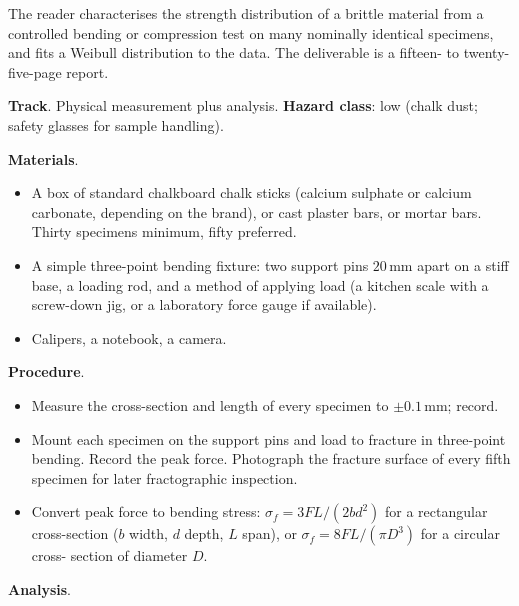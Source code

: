 \begin{project}
The reader characterises the strength distribution of a brittle
material from a controlled bending or compression test on many
nominally identical specimens, and fits a Weibull distribution to the
data. The deliverable is a fifteen- to twenty-five-page report.

\textbf{Track}. Physical measurement plus analysis.
\textbf{Hazard class}: low (chalk dust; safety glasses for sample
handling).

\textbf{Materials}.

\begin{itemize}[leftmargin=*]
\item A box of standard chalkboard chalk sticks (calcium sulphate or
  calcium carbonate, depending on the brand), or cast plaster bars,
  or mortar bars. Thirty specimens minimum, fifty preferred.
\item A simple three-point bending fixture: two support pins
  $20\,\text{mm}$ apart on a stiff base, a loading rod, and a method
  of applying load (a kitchen scale with a screw-down jig, or a
  laboratory force gauge if available).
\item Calipers, a notebook, a camera.
\end{itemize}

\textbf{Procedure}.

\begin{itemize}[leftmargin=*]
\item Measure the cross-section and length of every specimen to
  $\pm 0.1\,\text{mm}$; record.
\item Mount each specimen on the support pins and load to fracture in
  three-point bending. Record the peak force. Photograph the fracture
  surface of every fifth specimen for later fractographic inspection.
\item Convert peak force to bending stress: $\sigma_f = 3 F L / (2 b
  d^2)$ for a rectangular cross-section ($b$ width, $d$ depth, $L$
  span), or $\sigma_f = 8 F L / (\pi D^3)$ for a circular cross-
  section of diameter $D$.
\end{itemize}

\textbf{Analysis}.


\end{project}
